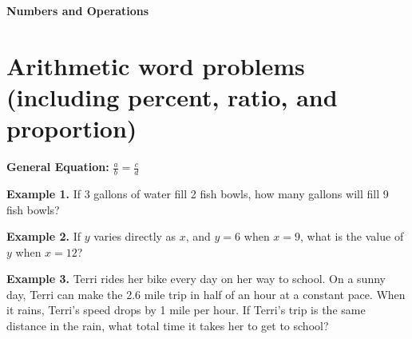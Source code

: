 \documentclass[12pt]{article}
\begin{document}
\textbf{\huge Numbers and Operations}

\section{Arithmetic word problems (including percent, ratio, and proportion)}

\bigskip
\textbf{General Equation:} $\frac{a}{b}=\frac{c}{d}$

\vfill
\textbf{Example 1.} If 3 gallons of water fill 2 fish bowls, how many gallons will fill 9 fish bowls?

\vfill
\textbf{Example 2.} If $y$ varies directly as $x$, and $y=6$ when $x=9$, what is the value of $y$ when $x=12$?

\vfill
\textbf{Example 3.} Terri rides her bike every day on her way to school. On a sunny day, Terri can make the 2.6 mile trip in half of an hour at a constant pace. When it rains, Terri's speed drops by 1 mile per hour. If Terri's trip is the same distance in the rain, what total time it takes her to get to school?

\vfill
\newpage
\setlength{\columnseprule}{1pt}
\end{document}
